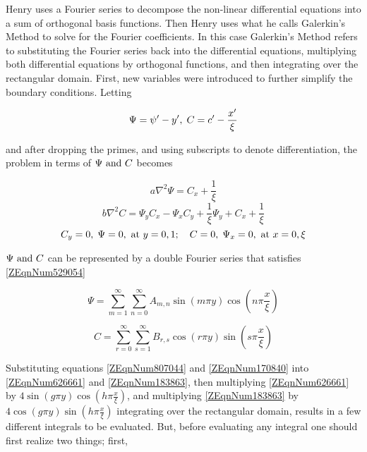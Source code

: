 Henry uses a Fourier series to decompose the non-linear differential equations into a sum of
orthogonal basis functions. Then Henry uses what he calls Galerkin's Method to solve for the Fourier
coefficients. In this case Galerkin's Method refers to substituting the Fourier series back into the
differential equations, multiplying both differential equations by orthogonal functions, and then
integrating over the rectangular domain. First, new variables were introduced to further simplify
the boundary conditions. Letting

\begin{equation} \label{3.1)} 
    \Psi = \psi '-y', \; C = c'-\frac{x'}{\xi } 
\end{equation}

and after dropping the primes, and using subscripts to denote differentiation,
the problem in terms of $\Psi \text{ and } C$ becomes

\begin{equation} \label{ZEqnNum626661} 
    a\nabla ^{2} \Psi =C_{x} +\frac{1}{\xi } 
\end{equation} 
\begin{equation} \label{ZEqnNum183863} 
    b\nabla ^{2} C=\Psi _{y} C_{x} -\Psi _{x} C_{y} +\frac{1}{\xi } \Psi _{y} +C_{x} +\frac{1}{\xi } 
\end{equation} 
\begin{equation} \label{ZEqnNum529054} 
    C_{y} =0 , \; \Psi =0, \text{ at } y = 0,1; \quad C = 0, \; \Psi
    _{x} = 0, \text{ at }x=0,\xi
\end{equation}

$\Psi\text{ and } C$ can be represented by a double Fourier series that satisfies
\eqref{ZEqnNum529054} \cite{Henry60}

\begin{equation} \label{ZEqnNum807044} \Psi =\sum _{m=1}^{\infty } \sum
_{n=0}^{\infty }A_{m,n} \sin \left(m\pi y\right)\cos \left(n\pi \frac{x}{\xi }
\right) \end{equation}

\begin{equation} \label{ZEqnNum170840} C=\sum _{r=0}^{\infty } \sum
_{s=1}^{\infty }B_{r,s} \cos \left(r\pi y\right)\sin \left(s\pi \frac{x}{\xi }
\right) \end{equation}

Substituting equations \eqref{ZEqnNum807044} and \eqref{ZEqnNum170840} into
\eqref{ZEqnNum626661} and \eqref{ZEqnNum183863}, then multiplying
\eqref{ZEqnNum626661} by $4\sin \left(g\pi y\right)\cos \left(h\pi \frac{x}{\xi
} \right)$, and multiplying \eqref{ZEqnNum183863} by $4\cos \left(g\pi
y\right)\sin \left(h\pi \frac{x}{\xi } \right)$ integrating over the rectangular
domain, results in a few different integrals to be evaluated. But, before
evaluating any integral one should first realize two things; first,

